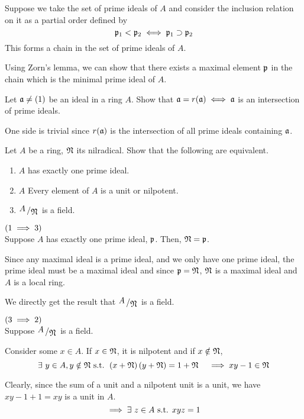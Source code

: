 Suppose we take the set of prime ideals of \(A\) and consider
the inclusion relation on it as a partial order defined by
\[
	\mathfrak{p}_1 < \mathfrak{p}_2 \iff \mathfrak{p}_1 \supset \mathfrak{p}_2
\]
This forms a chain in the set of prime ideals of \(A\).

Using Zorn's lemma, we can show that there exists a maximal element
\( \mathfrak{p} \) in the chain which is the minimal prime ideal of \(A\).


\begin{exercise}{}{}
	Let \(\mathfrak{a} \neq (1)\) be an ideal in a ring \(A\).
	Show that \(\mathfrak{a} = r(\mathfrak{a}) \iff \mathfrak{a}\) is an intersection
	of prime ideals.
\end{exercise}

One side is trivial since \(r(\mathfrak{a})\) is the intersection of all prime ideals
containing \(\mathfrak{a}\).




\begin{exercise}{}{}
	Let \(A\) be a ring, \(\mathfrak{N}\) its nilradical.
	Show that the following are equivalent.
	\begin{enumerate}
		\item \(A\) has exactly one prime ideal.
		\item \(A\) Every element of \(A\) is a unit or nilpotent.
		\item \(\bigslant{A}{\mfN}\) is a field.
	\end{enumerate}
\end{exercise}

\(\left( 1 \implies 3 \right)\) \\
Suppose \(A\) has exactly one prime ideal, \(\mathfrak{p}\).
Then, \(\mathfrak{N} = \mathfrak{p}\).

Since any maximal ideal is a prime ideal, and we only have one prime ideal,
the prime ideal must be a maximal ideal and since \(\mathfrak{p} = \mathfrak{N}\),
\(\mathfrak{N}\) is a maximal ideal and \(A\) is a local ring.

We directly get the result that \(\bigslant{A}{\mfN}\) is a field.


\(\left( 3 \implies 2 \right)\) \\
Suppose \(\bigslant{A}{\mfN}\) is a field.

Consider some \(x \in A\).
If \(x \in \mathfrak{N}\), it is nilpotent and if \(x \notin \mathfrak{N}\),
\[
	\exists\ y \in A, y \notin \mathfrak{N} \text{ s.t. } \left( x + \mathfrak{N} \right)\left( y + \mathfrak{N} \right)
	= 1 + \mathfrak{N} \quad \implies xy - 1 \in \mathfrak{N}
\]

Clearly, since the sum of a unit and a nilpotent unit is a unit, we have
\( xy - 1 + 1 = xy\) is a unit in \(A\).
\[
	\implies \exists\ z \in A \text{ s.t. } xyz = 1
\]

